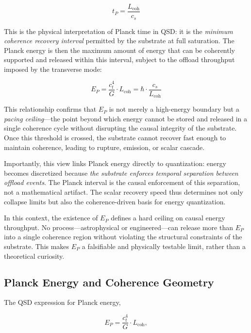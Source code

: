 \documentclass[entropy,article,submit,pdftex,moreauthors]{Definitions/mdpi}
\begin{document}
\begin{equation}
t_P = \frac{L_{\text{coh}}}{c_s}
\end{equation}

This is the physical interpretation of Planck time in QSD: it is the \textit{minimum coherence recovery interval} permitted by the substrate at full saturation. The Planck energy is then the maximum amount of energy that can be coherently supported and released within this interval, subject to the offload throughput imposed by the transverse mode:

\begin{equation}
E_P = \frac{c_t^4}{G} \cdot L_{\text{coh}} = \hbar \cdot \frac{c_s}{L_{\text{coh}}}
\end{equation}

This relationship confirms that $E_P$ is not merely a high-energy boundary but a \textit{pacing ceiling}—the point beyond which energy cannot be stored and released in a single coherence cycle without disrupting the causal integrity of the substrate. Once this threshold is crossed, the substrate cannot recover fast enough to maintain coherence, leading to rupture, emission, or scalar cascade.

Importantly, this view links Planck energy directly to quantization: energy becomes discretized because \textit{the substrate enforces temporal separation between offload events}. The Planck interval is the causal enforcement of this separation, not a mathematical artifact. The scalar recovery speed thus determines not only collapse limits but also the coherence-driven basis for energy quantization.

In this context, the existence of $E_P$ defines a hard ceiling on causal energy throughput. No process—astrophysical or engineered—can release more than $E_P$ into a single coherence region without violating the structural constraints of the substrate. This makes $E_P$ a falsifiable and physically testable limit, rather than a theoretical curiosity.

\subsection{Planck Energy and Coherence Geometry}

The QSD expression for Planck energy,

\begin{equation}
E_P = \frac{c_t^4}{G} \cdot L_{\text{coh}},
\end{equation}
\end{document}
